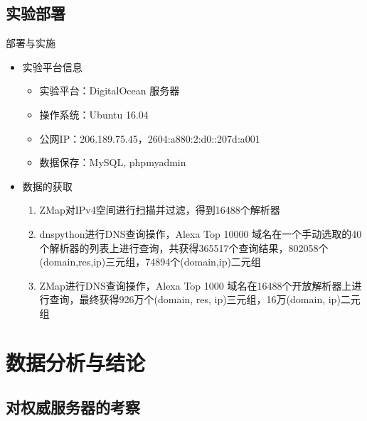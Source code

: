 \documentclass{beamer}
\begin{document}
\subsection{实验部署}

\begin{frame}{部署与实施}
  \begin{itemize}
    \item 实验平台信息
    \begin{itemize}
      \item 实验平台：DigitalOcean 服务器
      \item 操作系统：Ubuntu 16.04
      \item 公网IP：206.189.75.45，2604:a880:2:d0::207d:a001
      \item 数据保存：MySQL, phpmyadmin
  
    \end{itemize}
    \item 数据的获取
    \begin{enumerate}
      \item ZMap对IPv4空间进行扫描并过滤，得到16488个解析器
      \item dnspython进行DNS查询操作，Alexa Top 10000 域名在一个手动选取的40个解析器的列表上进行查询，共获得365517个查询结果，802058个(domain,res,ip)三元组，74894个(domain,ip)二元组
      \item ZMap进行DNS查询操作，Alexa Top 1000 域名在16488个开放解析器上进行查询，最终获得926万个(domain, res, ip)三元组，16万(domain, ip)二元组
    \end{enumerate}
  \end{itemize}
  
\end{frame}
\section{数据分析与结论}


\subsection{对权威服务器的考察}
\end{document}
